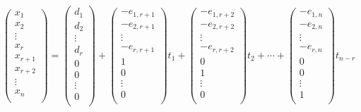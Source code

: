 \documentclass[a4paper]{ctexart}
\begin{document}
$$
\left(
\begin{array}{c}
  x_{1}\\
  x_{2}\\
  \vdots\\
  x_{r}\\
  x_{r+1}\\
  x_{r+2}\\
  \vdots\\
  x_{n}\\
\end{array}
\right)
=
\left(
\begin{array}{c}
  d_{1}\\
  d_{2}\\
  \vdots\\
  d_{r}\\
  0\\
  0\\
  \vdots\\
  0\\
\end{array}
\right)
+
\left(
\begin{array}{c}
  -e_{1,r+1}\\
  -e_{2,r+1}\\
  \vdots\\
  -e_{r,r+1}\\
  1\\
  0\\
  \vdots\\
  0\\
\end{array}
\right)
t_{1}
+
\left(
\begin{array}{c}
  -e_{1,r+2}\\
  -e_{2,r+2}\\
  \vdots\\
  -e_{r,r+2}\\
  0\\
  1\\
  \vdots\\
  0\\
\end{array}
\right)
t_{2}
+
\cdots
+
\left(
\begin{array}{c}
  -e_{1,n}\\
  -e_{2,n}\\
  \vdots\\
  -e_{r,n}\\
  0\\
  0\\
  \vdots\\
  1\\
\end{array}
\right)
t_{n-r}
$$
\end{document}
